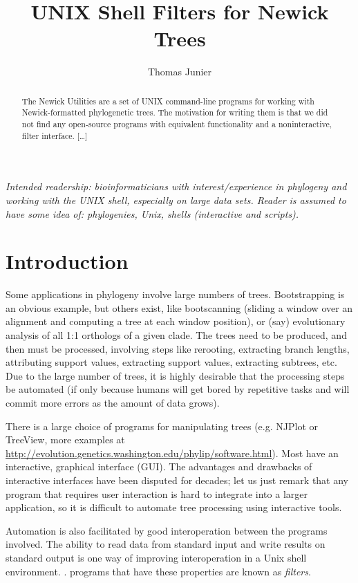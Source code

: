 \documentclass[a4paper,11pt]{article}
\title{UNIX Shell Filters for Newick Trees}
\author{Thomas Junier}
\newcommand{\gui}{\textsc{GUI}}
\newcommand{\unix}{Unix}
\begin{document}
\maketitle

\begin{abstract}
The Newick Utilities are a set of UNIX command-line programs for working with
Newick-formatted phylogenetic trees. The motivation for writing them is that we did not find any open-source programs with equivalent functionality and a noninteractive, filter interface. [\ldots]
\end{abstract}

\textit{\noindent{} Intended readership: bioinformaticians with interest/experience in phylogeny and working with the UNIX shell, especially on large data sets. Reader is assumed to have some idea of: phylogenies, Unix, shells (interactive and scripts).}
 
\section*{Introduction}

Some applications in phylogeny involve large numbers of trees. Bootstrapping is an obvious example, but others exist, like bootscanning (sliding a window over an alignment and computing a tree at each window position), or (say) evolutionary analysis of all 1:1 orthologs of a given clade. The trees need to be produced, and then must be processed, involving steps like rerooting, extracting branch lengths, attributing support values, extracting support values, extracting subtrees, etc. Due to the large number of trees, it is highly desirable that the processing steps be automated (if only because humans will get bored by repetitive tasks and will commit more errors as the amount of data grows).

There is a large choice of programs for manipulating trees (e.g.
NJPlot or TreeView, more examples at \url{
http://evolution.genetics.washington.edu/phylip/software.html}). Most have an interactive, graphical interface (\gui{}). The advantages and drawbacks of interactive interfaces have been disputed for decades; let us just remark that any program that requires user interaction is hard to integrate into a larger application, so it is difficult to automate tree processing using interactive tools.

Automation is also facilitated by good interoperation between the programs involved. The ability to read data from standard input and write results on standard output is one way of improving interoperation in a \unix{} shell environment. \cite{Gancarz2002}. programs that have these properties are known as \textit{filters}.
\end{document}
